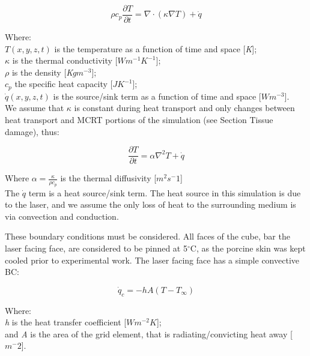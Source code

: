 \begin{equation}
\rho c_p \frac{\partial T}{\partial t}= \nabla \cdot (\kappa \nabla T) + \dot{q}
\label{eqn:heat}
\end{equation}

\noindent Where:\\
	\indent $T(x, y, z, t)$ is the temperature as a function of time and space [\textit{K}];\\
	\indent $\kappa$ is the thermal conductivity [$W m^{-1} K^{-1}$];\\ 
	\indent $\rho$ is the density [\textit{Kg}$m^{-3}$];\\
	\indent $c_p$ the specific heat capacity [$J K^{-1}$];\\
	\indent $\dot{q}(x,y,z,t)$ is the source/sink term as a function of time and space [$W m^{-3}$].\\
	
We assume that $\kappa$	is constant during heat transport and only changes between heat transport and MCRT portions of the simulation (see Section Tissue damage), thus:

\begin{equation}
\frac{\partial T}{\partial t}= \alpha \nabla^2 T + \dot{q}
\label{eqn:heatreal}
\end{equation}
	
Where $\alpha = \tfrac{\kappa}{\rho c_p}$ is the thermal diffusivity [$m^2 s^-{1}$]	\\
	
The $\dot{q}$ term is a heat source/sink term. The heat source in this simulation is due to the laser, and we assume the only loss of heat to the surrounding medium is via convection and conduction.
	
These boundary conditions must be considered. All faces of the cube, bar the laser facing face, are considered to be pinned at 5$^{\circ}$C, as the porcine skin was kept cooled prior to experimental work. The laser facing face has a simple convective BC:	

\begin{equation}
\dot{q}_c = -hA(T - T_\infty)
\label{eqn:bceqns}
\end{equation}

\noindent Where:\\
	\indent \textit{h} is the heat transfer coefficient [$W m^{-2} K$];\\
	\indent and \textit{A} is the area of the grid element, that is radiating/convicting heat away [$m^-{2}$].\\

